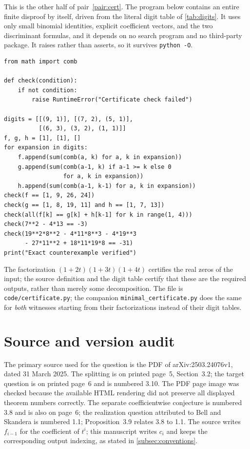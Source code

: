 \documentclass[11pt,letterpaper]{article}
\numberwithin{equation}{section}
\theoremstyle{definition}
\theoremstyle{remark}
\begin{document}
This is the other half of pair~\ref{pair:cert}. The program below contains an
entire finite disproof by itself, driven from the literal digit table of
\cref{tab:digits}. It uses only small binomial identities, explicit
coefficient vectors, and the two discriminant formulas, and it depends on no
search program and no third-party package. It raises rather than asserts, so
it survives \texttt{python -O}.
\begin{lstlisting}
from math import comb

def check(condition):
    if not condition:
        raise RuntimeError("Certificate check failed")

digits = [[(9, 1)], [(7, 2), (5, 1)],
          [(6, 3), (3, 2), (1, 1)]]
f, g, h = [1], [1], []
for expansion in digits:
    f.append(sum(comb(a, k) for a, k in expansion))
    g.append(sum(comb(a-1, k) if a-1 >= k else 0
                 for a, k in expansion))
    h.append(sum(comb(a-1, k-1) for a, k in expansion))
check(f == [1, 9, 26, 24])
check(g == [1, 8, 19, 11] and h == [1, 7, 13])
check(all(f[k] == g[k] + h[k-1] for k in range(1, 4)))
check(7**2 - 4*13 == -3)
check(19**2*8**2 - 4*11*8**3 - 4*19**3
      - 27*11**2 + 18*11*19*8 == -31)
print("Exact counterexample verified")
\end{lstlisting}
The factorization $(1+2t)(1+3t)(1+4t)$ certifies the real zeros of the input;
the source definition and the digit table certify that these are the required
outputs, rather than merely some decomposition. The file is
\texttt{code/certificate.py}; the companion
\texttt{minimal\_certificate.py} does the same for \emph{both} witnesses
starting from their factorizations instead of their digit tables.

\section{Source and version audit}\label{app:sources}

The primary source used for the question is the PDF of
arXiv:2503.24076v1, dated 31 March 2025. The splitting is on printed page~5,
Section~3.2; the target question is on printed page~6 and is numbered 3.10.
The PDF page image was checked because the available HTML rendering did not
preserve all displayed theorem numbers correctly. The separate
coefficientwise conjecture is numbered 3.8 and is also on page~6; the
realization question attributed to Bell and Skandera is numbered 1.1;
Proposition~3.9 relates 3.8 to 1.1. The source writes $f_{i-1}$ for the
coefficient of $t^i$; this manuscript writes $c_i$ and keeps the corresponding
output indexing, as stated in \cref{subsec:conventions}.
\end{document}
